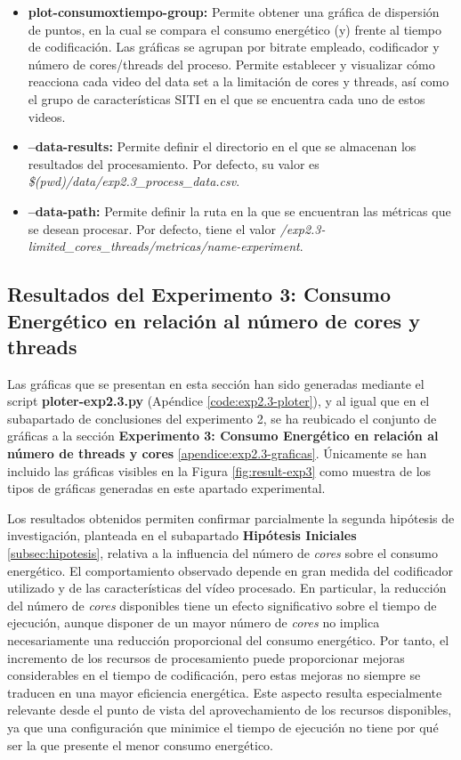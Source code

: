 \begin{itemize}
 \item \textbf{plot-consumoxtiempo-group:} Permite obtener una gráfica de dispersión de puntos, en la cual se compara el consumo energético (y) frente al tiempo de codificación. Las gráficas se agrupan por bitrate empleado, codificador y número de cores/threads del proceso. Permite establecer y visualizar cómo reacciona cada video del data set a la limitación de cores y threads, así como el grupo de características SITI en el que se encuentra cada uno de estos videos.
 \item \textbf{--data-results:} Permite definir el directorio en el que se almacenan los resultados del procesamiento. Por defecto, su valor es \textit{\$(pwd)/data/exp2.3\_process\_data.csv}.
 \item \textbf{--data-path:} Permite definir la ruta en la que se encuentran las métricas que se desean procesar. Por defecto, tiene el valor \textit{/exp2.3-limited\_cores\_threads/metricas/name-experiment}.

\end{itemize}

\subsection{Resultados del Experimento 3: Consumo Energético en relación al número de cores y threads}
 Las gráficas que se presentan en esta sección han sido generadas mediante el script \textbf{ploter-exp2.3.py} (Apéndice \ref{code:exp2.3-ploter}), y al igual que en el subapartado de conclusiones del experimento 2, se ha reubicado el conjunto de gráficas a la sección \textbf{Experimento 3: Consumo Energético en relación al número de threads y cores} \ref{apendice:exp2.3-graficas}. Únicamente se han incluido las gráficas visibles en la Figura \ref{fig:result-exp3} como muestra de los tipos de gráficas generadas en este apartado experimental.
 
 Los resultados obtenidos permiten confirmar parcialmente la segunda hipótesis de investigación, planteada en el subapartado \textbf{Hipótesis Iniciales} \ref{subsec:hipotesis}, relativa a la influencia del número de \textit{cores} sobre el consumo energético. El comportamiento observado depende en gran medida del codificador utilizado y de las características del vídeo procesado. En particular, la reducción del número de \textit{cores} disponibles tiene un efecto significativo sobre el tiempo de ejecución, aunque disponer de un mayor número de \textit{cores} no implica necesariamente una reducción proporcional del consumo energético. Por tanto, el incremento de los recursos de procesamiento puede proporcionar mejoras considerables en el tiempo de codificación, pero estas mejoras no siempre se traducen en una mayor eficiencia energética. Este aspecto resulta especialmente relevante desde el punto de vista del aprovechamiento de los recursos disponibles, ya que una configuración que minimice el tiempo de ejecución no tiene por qué ser la que presente el menor consumo energético.
 
